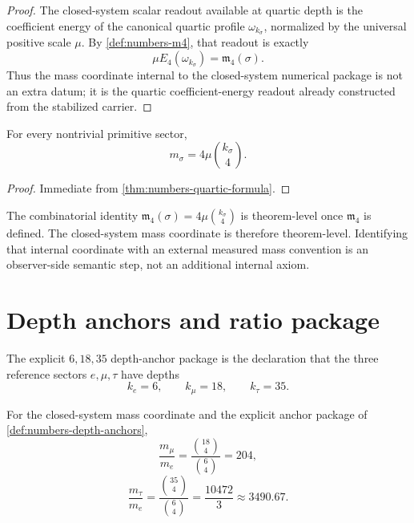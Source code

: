 \begin{proof}
The closed-system scalar readout available at quartic depth is the
coefficient energy of the canonical quartic profile
\(\omega_{k_\sigma}\), normalized by the universal positive scale
\(\mu\).  By \cref{def:numbers-m4}, that readout is exactly
\[
  \mu E_4(\omega_{k_\sigma})=\mathfrak m_4(\sigma).
\]
Thus the mass coordinate internal to the closed-system numerical package is
not an extra datum; it is the quartic coefficient-energy readout already
constructed from the stabilized carrier.
\end{proof}

\begin{corollary}
\label{cor:numbers-conditional-mass-law}
For every nontrivial primitive sector,
\[
  m_\sigma=4\mu\binom{k_\sigma}{4}.
\]
\end{corollary}

\begin{proof}
Immediate from \cref{thm:numbers-quartic-formula}.
\end{proof}

\begin{remark}
\label{rem:numbers-forced-vs-calibrated}
The combinatorial identity
\(\mathfrak m_4(\sigma)=4\mu\binom{k_\sigma}{4}\)
is theorem-level once \(\mathfrak m_4\) is defined.
The closed-system mass coordinate is therefore theorem-level.  Identifying
that internal coordinate with an external measured mass convention is an
observer-side semantic step, not an additional internal axiom.
\end{remark}

\section{Depth anchors and ratio package}
\label{sec:numbers-ratios}

\begin{definition}
\label{def:numbers-depth-anchors}
The explicit \(6,18,35\) depth-anchor package is the declaration that the
three reference sectors \(e,\mu,\tau\) have depths
\[
  k_e=6,
  \qquad
  k_\mu=18,
  \qquad
  k_\tau=35.
\]
\end{definition}

\begin{corollary}
\label{cor:numbers-ratios}
For the closed-system mass coordinate and the explicit anchor package
of \cref{def:numbers-depth-anchors},
\[
  \frac{m_\mu}{m_e}
  =
  \frac{\binom{18}{4}}{\binom{6}{4}}
  =204,
\]
\[
  \frac{m_\tau}{m_e}
  =
  \frac{\binom{35}{4}}{\binom{6}{4}}
  =\frac{10472}{3}
  \approx 3490.67.
\]
\end{corollary}

